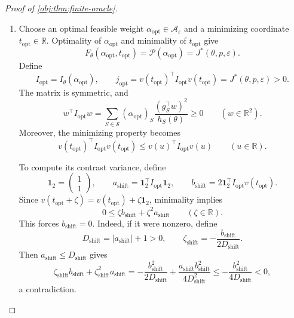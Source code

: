 \documentclass[11pt]{article}
\begin{document}
\begin{proof}[Proof of \cref{obj:thm:finite-oracle}]
\begin{enumerate}
Define the vector
\[
y_Q=\ell_Qv(t_Q)-w_Q\in\mathbb R^2.
\]
Using \(v(t_Q)^\top c=1\), expansion yields
\[
0\le y_Q^\top I_\theta(Q)y_Q
=
\ell_Q\left(
\ell_Qv(t_Q)^\top I_\theta(Q)v(t_Q)-1
\right).
\]
Since \(\ell_Q>0\), the intermediate bound above implies
\[
1
\le
\ell_Qv(t_Q)^\top I_\theta(Q)v(t_Q)
\le
\ell_QJ^*(\theta,p,\varepsilon).
\]
Taking the reciprocal of the positive optimized information gives
\[
V^*(\theta,p,\varepsilon)
=\frac{1}{J^*(\theta,p,\varepsilon)}
\le\ell_Q
=c^\top I_\theta(Q)^+c.
\]

\item Choose an optimal feasible weight
\(\alpha_{\mathrm{opt}}\in\mathcal A_\varepsilon\) and a minimizing
coordinate \(t_{\mathrm{opt}}\in\mathbb R\). Optimality of \(\alpha_{\mathrm{opt}}\) and minimality of
\(t_{\mathrm{opt}}\) give
\[
F_\theta(\alpha_{\mathrm{opt}},t_{\mathrm{opt}})
=
\mathscr P(\alpha_{\mathrm{opt}})
=
J^*(\theta,p,\varepsilon).
\]
Define
\[
I_{\mathrm{opt}}=I_\theta(\alpha_{\mathrm{opt}}),
\qquad
j_{\mathrm{opt}}
=
v(t_{\mathrm{opt}})^\top I_{\mathrm{opt}}v(t_{\mathrm{opt}})
=
J^*(\theta,p,\varepsilon)>0.
\]
The matrix is symmetric, and
\[
w^\top I_{\mathrm{opt}}w
=
\sum_{S\in\mathcal S}
(\alpha_{\mathrm{opt}})_S
\frac{(g_S^\top w)^2}{h_S(\theta)}
\ge0
\qquad(w\in\mathbb R^2).
\]
Moreover, the minimizing property becomes
\[
v(t_{\mathrm{opt}})^\top I_{\mathrm{opt}}v(t_{\mathrm{opt}})
\le
v(u)^\top I_{\mathrm{opt}}v(u)
\qquad(u\in\mathbb R).
\]

To compute its contrast variance, define
\[
\mathbf 1_2=\begin{pmatrix}1\\1\end{pmatrix},
\qquad
a_{\mathrm{shift}}=\mathbf 1_2^\top I_{\mathrm{opt}}\mathbf 1_2,
\qquad
b_{\mathrm{shift}}
=2\mathbf 1_2^\top I_{\mathrm{opt}}v(t_{\mathrm{opt}}).
\]
Since \(v(t_{\mathrm{opt}}+\zeta)
=v(t_{\mathrm{opt}})+\zeta\mathbf 1_2\), minimality implies
\[
0\le
\zeta b_{\mathrm{shift}}+\zeta^2a_{\mathrm{shift}}
\qquad(\zeta\in\mathbb R).
\]
This forces \(b_{\mathrm{shift}}=0\). Indeed, if it were nonzero,
define
\[
D_{\mathrm{shift}}=|a_{\mathrm{shift}}|+1>0,
\qquad
\zeta_{\mathrm{shift}}
=-\frac{b_{\mathrm{shift}}}{2D_{\mathrm{shift}}}.
\]
Then \(a_{\mathrm{shift}}\le D_{\mathrm{shift}}\) gives
\[
\zeta_{\mathrm{shift}}b_{\mathrm{shift}}
+\zeta_{\mathrm{shift}}^2a_{\mathrm{shift}}
=
-\frac{b_{\mathrm{shift}}^2}{2D_{\mathrm{shift}}}
+\frac{a_{\mathrm{shift}}b_{\mathrm{shift}}^2}
{4D_{\mathrm{shift}}^2}
\le
-\frac{b_{\mathrm{shift}}^2}{4D_{\mathrm{shift}}}<0,
\]
a contradiction.


\end{enumerate}
\end{proof}
\end{document}
